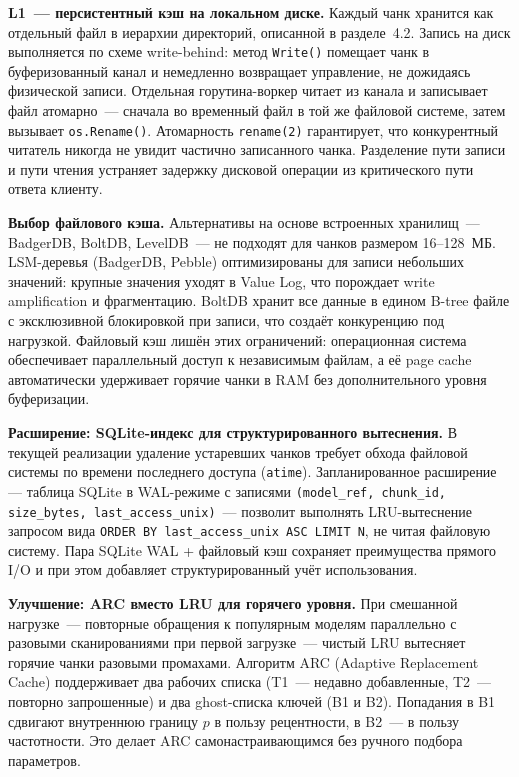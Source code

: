 \textbf{L1~--- персистентный кэш на локальном диске.} Каждый чанк хранится как отдельный файл в иерархии директорий, описанной в разделе~4.2. Запись на диск выполняется по схеме write-behind: метод \texttt{Write()} помещает чанк в буферизованный канал и немедленно возвращает управление, не дожидаясь физической записи. Отдельная горутина-воркер читает из канала и записывает файл атомарно~--- сначала во временный файл в той же файловой системе, затем вызывает \texttt{os.Rename()}. Атомарность \texttt{rename(2)} гарантирует, что конкурентный читатель никогда не увидит частично записанного чанка. Разделение пути записи и пути чтения устраняет задержку дисковой операции из критического пути ответа клиенту.

\textbf{Выбор файлового кэша.} Альтернативы на основе встроенных хранилищ~--- BadgerDB, BoltDB, LevelDB~--- не подходят для чанков размером 16--128~МБ. LSM-деревья (BadgerDB, Pebble) оптимизированы для записи небольших значений: крупные значения уходят в Value Log, что порождает write amplification и фрагментацию. BoltDB хранит все данные в едином B-tree файле с эксклюзивной блокировкой при записи, что создаёт конкуренцию под нагрузкой. Файловый кэш лишён этих ограничений: операционная система обеспечивает параллельный доступ к независимым файлам, а её page cache автоматически удерживает горячие чанки в RAM без дополнительного уровня буферизации.

\textbf{Расширение: SQLite-индекс для структурированного вытеснения.} В текущей реализации удаление устаревших чанков требует обхода файловой системы по времени последнего доступа (\texttt{atime}). Запланированное расширение --- таблица SQLite в WAL-режиме с записями \texttt{(model\_ref, chunk\_id, size\_bytes, last\_access\_unix)}~--- позволит выполнять LRU-вытеснение запросом вида \texttt{ORDER BY last\_access\_unix ASC LIMIT N}, не читая файловую систему. Пара SQLite WAL + файловый кэш сохраняет преимущества прямого I/O и при этом добавляет структурированный учёт использования.

\textbf{Улучшение: ARC вместо LRU для горячего уровня.} При смешанной нагрузке~--- повторные обращения к популярным моделям параллельно с разовыми сканированиями при первой загрузке~--- чистый LRU вытесняет горячие чанки разовыми промахами. Алгоритм ARC (Adaptive Replacement Cache) поддерживает два рабочих списка (T1~--- недавно добавленные, T2~--- повторно запрошенные) и два ghost-списка ключей (B1 и B2). Попадания в B1 сдвигают внутреннюю границу $p$ в пользу рецентности, в B2~--- в пользу частотности. Это делает ARC самонастраивающимся без ручного подбора параметров.


